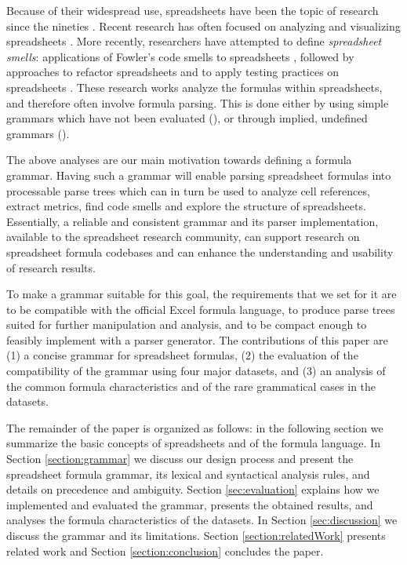 \documentclass[times]{smrauth}
\begin{document}
Because of their widespread use, spreadsheets have been the topic of research since the nineties \cite{DBLP:journals/sigplan/BellP93}. Recent research has often focused on analyzing and visualizing spreadsheets \cite{DBLP:conf/icse/HermansPD11, Shio1999}. More recently, researchers have attempted to define \emph{spreadsheet smells}: applications of Fowler's code smells to spreadsheets \cite{DBLP:conf/icse/HermansPD12, DBLP:conf/icsm/Hermans212}, followed by approaches to refactor spreadsheets \cite{hermans2014bumblebee,badame2012refactoring} and to apply testing practices on spreadsheets \cite{Expector}. These research works analyze the formulas within spreadsheets, and therefore often involve formula parsing. This is done either by using simple grammars which have not been evaluated (\cite{badame2012refactoring}), or through implied, undefined grammars (\cite{DBLP:conf/icse/HermansPD11,DBLP:conf/icse/HermansPD12, DBLP:conf/icsm/Hermans212, hermans2014bumblebee, Expector}). 

The above analyses are our main motivation towards defining a formula grammar. Having such a grammar will enable parsing spreadsheet formulas into processable parse trees which can in turn be used to analyze cell references, extract metrics, find code smells and explore the structure of spreadsheets. Essentially, a reliable and consistent grammar and its parser implementation, available to the spreadsheet research community, can support research on spreadsheet formula codebases and can enhance the understanding and usability of research results.

To make a grammar suitable for this goal, the requirements that we set for it are to be compatible with the official Excel formula language, to produce parse trees suited for further manipulation and analysis, and to be compact enough to feasibly implement with a parser generator. The contributions of this paper are (1) a concise grammar for spreadsheet formulas, (2) the evaluation of the compatibility of the grammar using four major datasets, and (3) an analysis of the common formula characteristics and of the rare grammatical cases in the datasets.

The remainder of the paper is organized as follows: in the following section we summarize the basic concepts of spreadsheets and of the formula language. In Section \ref{section:grammar} we discuss our design process and present the spreadsheet formula grammar, its lexical and syntactical analysis rules, and details on precedence and ambiguity. Section \ref{sec:evaluation} explains how we implemented and evaluated the grammar, presents the obtained results, and analyses the formula characteristics of the datasets. In Section \ref{sec:discussion} we discuss the grammar and its limitations. Section \ref{section:relatedWork} presents related work and Section \ref{section:conclusion} concludes the paper.
\end{document}
